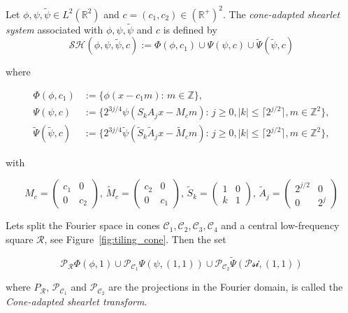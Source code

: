 \bigskip

\begin{defn}
\label{def:cone_shearlets}
Let $\phi,\psi,\tilde{\psi}\in L^2(\mathbb{R}^2)$ and $c=(c_1,c_2)\in (\mathbb{R}^+)^2$. The \textit{cone-adapted shearlet system} associated with $\phi,\psi,\tilde{\psi}$ and $c$ is defined by 
$$
\mathcal{SH}(\phi,\psi,\tilde{\psi},c):=\Phi(\phi,c_1)\cup\Psi(\psi,c)\cup \tilde{\Psi}(\tilde{\psi},c)
$$

where

$$
\begin{aligned}
\Phi(\phi,c_1)&:=\{\phi(x-c_1m)\text{: }m\in\mathbb{Z}\},\\
\Psi(\psi,c)&:=\{2^{3j/4}\psi(S_kA_jx-M_cm)\text{: } j\geq 0,|k|\leq\lceil 2^{j/2}\rceil,m\in\mathbb{Z}^2\},\\
\tilde{\Psi}(\tilde{\psi},c)&:=\{2^{3j/4}\tilde{\psi}(\tilde{S}_k\tilde{A}_jx-\tilde{M}_cm)\text{: } j \geq 0,|k|\leq\lceil 2^{j/2}\rceil,m\in\mathbb{Z}^2\},
\end{aligned}
$$

with 

$$
M_c=\left(\begin{matrix} c_1 & 0 \\ 0 & c_2\end{matrix}\right)\text{,  }
\tilde{M}_c=\left(\begin{matrix} c_2 & 0 \\ 0 & c_1\end{matrix}\right) \text{,  }
\tilde{S}_k=\left(\begin{matrix} 1 & 0 \\ k & 1 \end{matrix}\right)\text{,  }
\tilde{A}_j=\left(\begin{matrix} 2^{j/2} & 0 \\ 0 & 2^j\end{matrix}\right)
$$

Lets split the Fourier space in cones $\mathcal{C}_1, \mathcal{C}_2, \mathcal{C}_3,\mathcal{C}_4$ and a central low-frequency square $\mathcal{R}$, see Figure~\ref{fig:tiling_cone}. Then the set

$$
\mathcal{P}_{\mathcal{R}}\Phi(\phi,1)\cup \mathcal{P}_{\mathcal{C}_1}\Psi(\psi,(1,1))\cup\mathcal{P}_{\mathcal{C}_2}\tilde{\Psi}(\mathcal{Psi},(1,1))
$$

where $P_{\mathcal{R}}$, $\mathcal{P}_{\mathcal{C}_1}$ and $\mathcal{P}_{\mathcal{C}_2}$ are the projections in the Fourier domain, is called the \textit{Cone-adapted shearlet transform}.
\end{defn}

